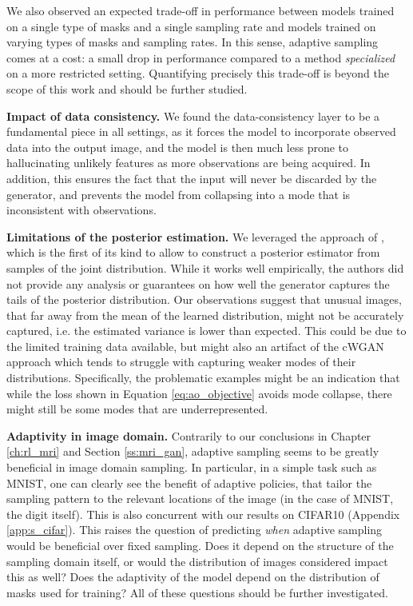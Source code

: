 We also observed an expected trade-off in performance between models trained on a single type of masks and a single sampling rate and models trained on varying types of masks and sampling rates. In this sense, adaptive sampling comes at a cost: a small drop in performance compared to a method \textit{specialized} on a more restricted setting. Quantifying precisely this trade-off is beyond the scope of this work and should be further studied.

\textbf{Impact of data consistency.} We found the data-consistency layer to be a fundamental piece in all settings, as it forces the model to incorporate observed data into the output image, and the model is then much less prone to hallucinating unlikely features as more observations are being acquired. In addition, this ensures the fact that the input will never be discarded by the generator, and prevents the model from collapsing into a mode that is inconsistent with observations.

\textbf{Limitations of the posterior estimation.} We leveraged the approach of \citep{adler2018deep}, which is the first of its kind to allow to construct a posterior estimator from samples of the joint distribution. While it works well empirically, the authors did not provide any analysis or guarantees on how well the generator captures the tails of the posterior distribution. Our observations suggest that unusual images, that far away from the mean of the learned distribution, might not be accurately captured, i.e. the estimated variance is lower than expected. This could be due to the limited training data available, but might also an artifact of the cWGAN approach which tends to struggle with capturing weaker modes of their distributions. Specifically, the problematic examples might be an indication that while the loss shown in Equation \ref{eq:ao_objective} avoids mode collapse, there might still be some modes that are underrepresented.

\textbf{Adaptivity in image domain.} Contrarily to our conclusions in Chapter \ref{ch:rl_mri} and Section \ref{ss:mri_gan}, adaptive sampling seems to be greatly beneficial in image domain sampling. In particular, in a simple task such as MNIST, one can clearly see the benefit of adaptive policies, that tailor the sampling pattern to the relevant locations of the image (in the case of MNIST, the digit itself). This is also concurrent with our results on CIFAR10 (Appendix \ref{app:s_cifar}). This raises the question of predicting \textit{when} adaptive sampling would be beneficial over fixed sampling. Does it depend on the structure of the sampling domain itself, or would the distribution of images considered impact this as well? Does the adaptivity of the model depend on the distribution of masks used for training? All of these questions should be further investigated. 

